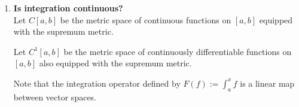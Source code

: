 \documentclass[12pt]{article}
\begin{document}
\begin{enumerate}[label=\roman*)]
\begin{proof}
    Define a norm on $C[a,b]$ by $\norm{f} := \sup_{x\in [a,b]}|f(x)|$.

    Then, according to the lemma, $D$ is continuous if and only if
    $\{\norm{D(f)} : \norm{f} \leq 1 \}$ is bounded.

    Suppose for a contradiction that $M$ is such a bound.

    But consider the logistic function $f:[a,b] \to (0, 1)$ given by
    $f(x) := (1 + e^{-4(M+1)(x-a)})^{-1}$.

    Clearly $\norm{f} < 1$.

    Its derivative is $f'(x) = 4(M+1)f(x-a)(1-f(x-a))$ which (I assert) is continuous.

    So we have $f \in C^1[a,b]$ and $\norm{f} < 1$ and yet $f'(a) = M+1$.

    Therefore no such bound $M$ exists. Therefore the differentiation operator is not continuous.
  \end{proof}

  \begin{proof} (II Alex Coward)~\\
    Define $D:C^1[a,b] \to C[a,b]$ to be differentiation.

    We construct a sequence of functions that tend to the zero function, but whose derivatives
    always have image $[0, 1]$.

    Define $f_n(x) := \frac{1}{n}\sin\(\frac{nb}{2\pi}(x - a)\)$.

    Note that $(D f_n)(x) = \frac{b}{2\pi}\cos\(\frac{nb}{2\pi}(x - a)\)$.

    Note also that $\limn f_n = 0$.

    Suppose for a contradiction that $D$ is continuous.

    Then $\limn D(f_n) = D(\limn f_n) = D(0) = 0$.


  \end{proof}

\newpage
\item \textbf{Is integration continuous?}\\
  Let $C[a,b]$ be the metric space of continuous functions on $[a,b]$ equipped with the supremum
  metric.

  Let $C^1[a,b]$ be the metric space of continuously differentiable functions on $[a,b]$ also
  equipped with the supremum metric.

  Note that the integration operator defined by $F(f) := \int_a^x f$ is a linear map between vector
  spaces.


\end{enumerate}
\end{document}
